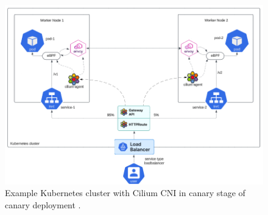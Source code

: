 \begin{figure}[H]
    \centering
    \includegraphics[width=1\columnwidth]{images/cilium_dataflow.png}
    \caption{Example Kubernetes cluster with Cilium CNI in canary stage of canary deployment \cite{CiliumUseCases}.}
    \label{fig:ciliumDataflow}
\end{figure}

